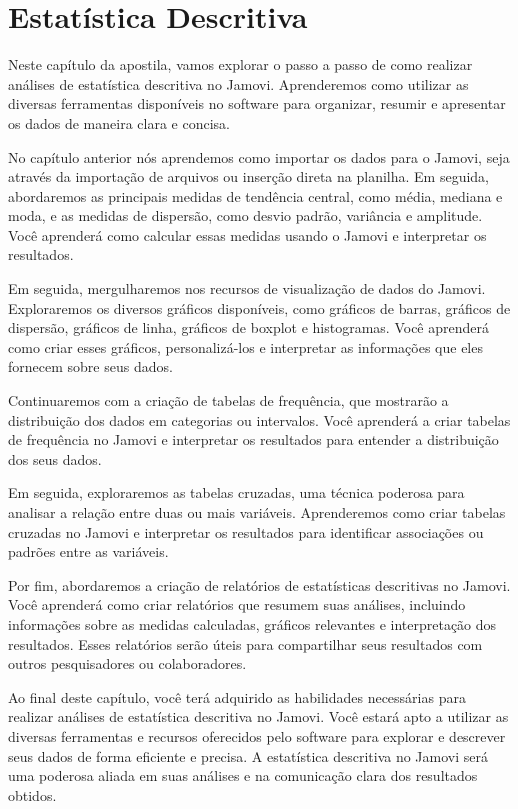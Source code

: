 \chapter{Estatística Descritiva}

Neste capítulo da apostila, vamos explorar o passo a passo de como realizar análises de estatística descritiva no Jamovi. Aprenderemos como utilizar as diversas ferramentas disponíveis no software para organizar, resumir e apresentar os dados de maneira clara e concisa.

No capítulo anterior nós aprendemos como importar os dados para o Jamovi, seja através da importação de arquivos ou inserção direta na planilha. Em seguida, abordaremos as principais medidas de tendência central, como média, mediana e moda, e as medidas de dispersão, como desvio padrão, variância e amplitude. Você aprenderá como calcular essas medidas usando o Jamovi e interpretar os resultados.

Em seguida, mergulharemos nos recursos de visualização de dados do Jamovi. Exploraremos os diversos gráficos disponíveis, como gráficos de barras, gráficos de dispersão, gráficos de linha, gráficos de boxplot e histogramas. Você aprenderá como criar esses gráficos, personalizá-los e interpretar as informações que eles fornecem sobre seus dados.

Continuaremos com a criação de tabelas de frequência, que mostrarão a distribuição dos dados em categorias ou intervalos. Você aprenderá a criar tabelas de frequência no Jamovi e interpretar os resultados para entender a distribuição dos seus dados.

Em seguida, exploraremos as tabelas cruzadas, uma técnica poderosa para analisar a relação entre duas ou mais variáveis. Aprenderemos como criar tabelas cruzadas no Jamovi e interpretar os resultados para identificar associações ou padrões entre as variáveis.

Por fim, abordaremos a criação de relatórios de estatísticas descritivas no Jamovi. Você aprenderá como criar relatórios que resumem suas análises, incluindo informações sobre as medidas calculadas, gráficos relevantes e interpretação dos resultados. Esses relatórios serão úteis para compartilhar seus resultados com outros pesquisadores ou colaboradores.

Ao final deste capítulo, você terá adquirido as habilidades necessárias para realizar análises de estatística descritiva no Jamovi. Você estará apto a utilizar as diversas ferramentas e recursos oferecidos pelo software para explorar e descrever seus dados de forma eficiente e precisa. A estatística descritiva no Jamovi será uma poderosa aliada em suas análises e na comunicação clara dos resultados obtidos.

